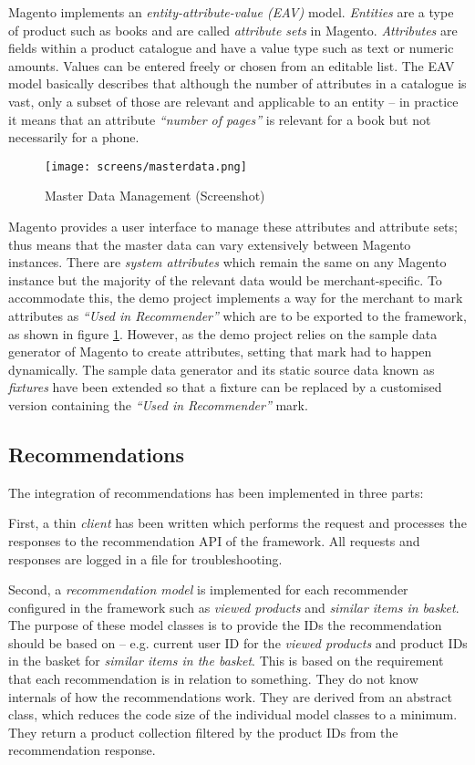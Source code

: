 Magento implements an \emph{entity-attribute-value (EAV)} model. \emph{Entities} are a type of product such as books and are called \emph{attribute sets} in Magento. \emph{Attributes} are fields within a product catalogue and have a value type such as text or numeric amounts. Values can be entered freely or chosen from an editable list. The EAV model basically describes that although the number of attributes in a catalogue is vast, only a subset of those are relevant and applicable to an entity -- in practice it means that an attribute \emph{``number of pages''} is relevant for a book but not necessarily for a phone.

\begin{figure}[!ht]
    \texttt{[image: screens/masterdata.png]}
    \caption{Master Data Management (Screenshot)}
    \label{fig:implementation-magento-master-data}
\end{figure}

Magento provides a user interface to manage these attributes and attribute sets; thus means that the master data can vary extensively between Magento instances. There are \emph{system attributes} which remain the same on any Magento instance but the majority of the relevant data would be merchant-specific. To accommodate this, the demo project implements a way for the merchant to mark attributes as \emph{``Used in Recommender''} which are to be exported to the framework, as shown in figure \ref{fig:implementation-magento-master-data}. However, as the demo project relies on the sample data generator of Magento to create attributes, setting that mark had to happen dynamically. The sample data generator and its static source data known as \emph{fixtures} have been extended so that a fixture can be replaced by a customised version containing the \emph{``Used in Recommender''} mark.

\subsection{Recommendations}

The integration of recommendations has been implemented in three parts:

First, a thin \emph{client} has been written which performs the request and processes the responses to the recommendation API of the framework. All requests and responses are logged in a file for troubleshooting.

Second, a \emph{recommendation model} is implemented for each recommender configured in the framework such as \emph{viewed products} and \emph{similar items in basket}. The purpose of these model classes is to provide the IDs the recommendation should be based on -- e.g. current user ID for the \emph{viewed products} and product IDs in the basket for \emph{similar items in the basket}. This is based on the requirement that each recommendation is in relation to something. They do not know internals of how the recommendations work. They are derived from an abstract class, which reduces the code size of the individual model classes to a minimum. They return a product collection filtered by the product IDs from the recommendation response.

